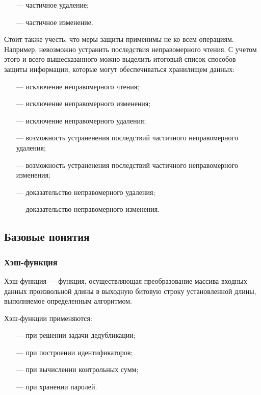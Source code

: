 \begin{enumerate}
	\item [---] частичное удаление;
	\item [---] частичное изменение.
\end{enumerate}

Стоит также учесть, что меры защиты применимы не ко всем операциям. Например, невозможно устранить последствия неправомерного чтения. С учетом этого и всего вышесказанного можно выделить итоговый список способов защиты информации, которые могут обеспечиваться хранилищем данных:
\begin{itemize}
	\item [---] исключение неправомерного чтения;
	\item [---] исключение неправомерного изменения;
	\item [---] исключение неправомерного удаления;
	\item [---] возможность устраненения последствий частичного неправомерного удаления;
	\item [---] возможность устраненения последствий частичного неправомерного изменения;
	\item [---] доказательство неправомерного удаления;
	\item [---] доказательство неправомерного изменения.
\end{itemize}

\subsection{Базовые понятия}

\subsubsection{Хэш-функция}

Хэш-функция --- функция, осуществляющая преобразование массива входных данных произвольной длины в выходную битовую строку установленной длины, выполняемое определенным алгоритмом. \cite{hash}

Хэш-функции применяются:
\begin{itemize}
    \item[---] при решении задачи дедубликации;
    \item[---] при построении идентификаторов;
    \item[---] при вычислении контрольных сумм;
    \item[---] при хранении паролей.
\end{itemize}


